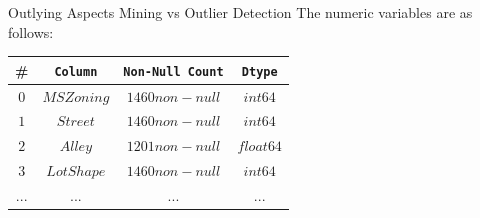 \documentclass[
size=14pt,
paper=smartboard,  %
mode=present, 		%
display=slides, 	%
style=tuliplab,  	%
pauseslide,
fleqn,leqno]{powerdot}
\begin{document}
	\begin{slide}[toc=,bm=]{Outlying Aspects Mining vs Outlier Detection}
		The numeric variables are as follows:
		\begin{center}
			\begin{tabular}{c c c c}
				\toprule
				\# & \texttt{Column}  & \texttt{Non-Null Count} & \texttt{Dtype} \\
				\midrule
				$0$
				&  {$MSZoning$} &  {$1460 non-null$} &  {$int64$}  \\
				$1$
				&  {$Street$} &  {$1460 non-null$}&  {$int64$} \\
				$2$
				&  {$Alley$} &  {$1201 non-null$} &  {$float64$} \\
				$3$
				&  {$LotShape$} &  {$1460 non-null$}&  {$int64$} \\
				$...$
				&  {$...$} &  {$...$} &  {$...$}\\
				\bottomrule
			\end{tabular}
		\end{center}
	\end{slide}
\end{document}
